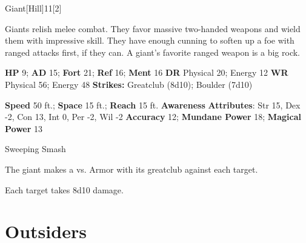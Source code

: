   \begin{monsection}{Giant}[Hill]{11}[2]
    \vspace{-1em}\vspace{-1em}
    \vspace{0em}

    
      Giants relish melee combat.
      They favor massive two-handed weapons and wield them with impressive skill.
      They have enough cunning to soften up a foe with ranged attacks first, if they can.
      A giant's favorite ranged weapon is a big rock.
    

    \begin{spellcontent}
      \begin{spelltargetinginfo}
        \pari \textbf{HP} 9;
          \textbf{AD} 15;
          \textbf{Fort} 21;
          \textbf{Ref} 16;
          \textbf{Ment} 16
        \pari \textbf{DR} Physical 20; Energy 12
        \pari \textbf{WR} Physical 56; Energy 48
        \pari \textbf{Strikes:}
            Greatclub  (8d10); Boulder  (7d10)
      \end{spelltargetinginfo}
    \end{spellcontent}
    \begin{monsterfooter}
      \pari \textbf{Speed} 50 ft.;
        \textbf{Space} 15 ft.;
        \textbf{Reach} 15 ft.
      \pari \textbf{Awareness} 
      \pari \textbf{Attributes}:
        Str 15, Dex -2,
        Con 13, Int 0,
        Per -2, Wil -2
      \pari \textbf{Accuracy} 12;
        \textbf{Mundane Power} 18;
      \textbf{Magical Power} 13
    \end{monsterfooter}
  \end{monsection}
  \begin{freeability}{Sweeping Smash}
      
      The giant makes a 
         vs. Armor
        with its greatclub against each target.
    
    \hit Each target takes 8d10  damage.
    \end{freeability}
  
        \section{Outsiders}
      
